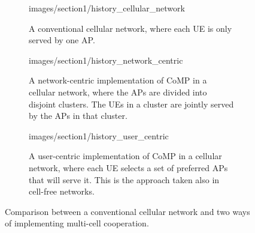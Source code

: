 \begin{figure} 
        \centering \vspace{-4mm}
        \begin{subfigure}[b]{\columnwidth} \centering
	\begin{overpic}[width=.75\columnwidth,tics=10]{images/section1/history_cellular_network}
\end{overpic} 
                \caption{A conventional cellular network, where each \gls{UE} is only served by one \gls{AP}.}    \vspace{+2mm}
        \end{subfigure} 
        \begin{subfigure}[b]{\columnwidth} \centering 
	\begin{overpic}[width=.75\columnwidth,tics=10]{images/section1/history_network_centric}
\end{overpic} 
                \caption{A network-centric implementation of \gls{CoMP} in a cellular network, where the \glspl{AP} are divided into disjoint clusters. The \glspl{UE} in a cluster are jointly served by the \glspl{AP} in that cluster.}  \vspace{+2mm}
        \end{subfigure} 
        \begin{subfigure}[b]{\columnwidth} \centering
	\begin{overpic}[width=.75\columnwidth,tics=10]{images/section1/history_user_centric}
\end{overpic} 
                \caption{A user-centric implementation of \gls{CoMP} in a cellular network, where each \gls{UE} selects a set of preferred \glspl{AP} that will serve it. This is the approach taken also in cell-free networks.}    \vspace{+1mm}
        \end{subfigure} 
        \caption{Comparison between a conventional cellular network and two ways of implementing multi-cell cooperation.} 
        \label{figure_cellular_clusters}  
\end{figure}




